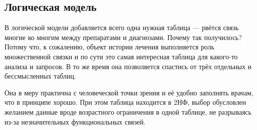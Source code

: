 \documentclass[12pt]{article}
\begin{document}
	\subsection{Логическая модель}
	\begin{center}
	\end{center}
	В логической модели добавляется всего одна нужная таблица --- рвётся связь многие ко многим между препаратами и диагнозами. Почему так получилось? Потому что, к сожалению, объект истории лечения выполняется роль множественной связки и по сути это самая интересная таблица для какого-то анализа и запросов. В то же время она позволяется спастись от трёх отдельных и бессмысленных таблиц.
	
	Она в меру практична с человеческой точки зрения и её удобно заполнять врачам, что в принципе хорошо.
	При этом таблица находится в 2НФ, выбор обусловлен желанием данные вроде возрастного ограничения в одной таблице, не разрываясь из-за незначительных функциональных связей.
\end{document}
